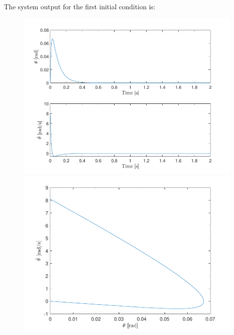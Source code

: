 \documentclass[10pt]{article}
\begin{document}
The system output for the first initial condition is:
\begin{figure}[ht]
    \centering
    \begin{minipage}[b]{0.45\textwidth}
        \centering
        \includegraphics[clip,width=1\linewidth]{lab1/figs/section7_controlled_state_evolution_x_0_1.pdf}
    \end{minipage}
    \begin{minipage}[b]{0.45\textwidth}
        \centering
        \includegraphics[clip,width=1\linewidth]{lab1/figs/section7_controlled_state_orbit_x_0_1.pdf}
    \end{minipage}
\end{figure}
\end{document}
